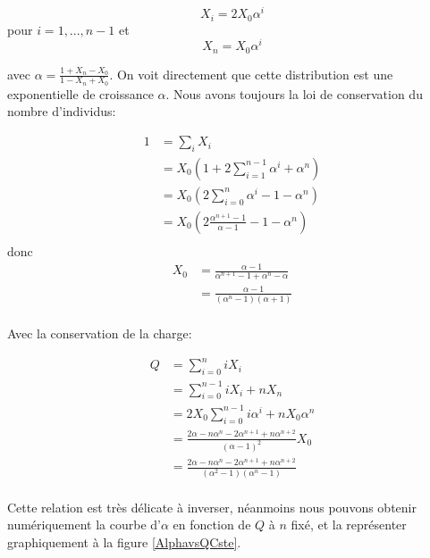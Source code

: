\begin{equation}
X_i=2 X_0 \alpha^i
\end{equation}
pour $i=1,...,n-1$ et 
\begin{equation}
X_n= X_0 \alpha^i
\end{equation}

avec $\alpha = \frac{1+X_n-X_0}{1-X_n+X_0}$.
On voit directement que cette distribution est une exponentielle de croissance $\alpha$. Nous avons toujours la loi de conservation du nombre d'individus:

\begin{equation}
\begin{aligned}
1&= \sum_i X_i\\
	&= X_0 (1+2\sum_{i=1}^{n-1}\alpha^i+\alpha^n)\\
	&= X_0 (2\sum_{i=0}^{n}\alpha^i-1-\alpha^n)\\
	&= X_0 (2 \frac{\alpha^{n+1}-1}{\alpha-1}-1-\alpha^n)\\
\end{aligned}
\end{equation}
donc
\begin{equation}
\begin{aligned}
X_0	&= \frac{\alpha-1}{\alpha^{n+1}-1+\alpha^n-\alpha}\\
	&= \frac{\alpha-1}{(\alpha^{n}-1)(\alpha+1)}\\
\end{aligned}
\end{equation}

Avec la conservation de la charge:

\begin{equation}
\begin{aligned}
Q	&= \sum_{i=0}^n i X_i\\
	&= \sum_{i=0}^{n-1} i X_i + n X_n\\
	&= 2 X_0 \sum_{i=0}^{n-1} i \alpha^i + n X_0 \alpha^n\\
	&= \frac{2\alpha -n\alpha^n-2\alpha^{n+1}+n\alpha^{n+2}}{(\alpha-1)^2}X_0\\
	&= \frac{2\alpha -n\alpha^n-2\alpha^{n+1}+n\alpha^{n+2}}{(\alpha^2-1)(\alpha^{n}-1)}\\
\end{aligned}
\end{equation}

Cette relation est très délicate à inverser, néanmoins nous pouvons obtenir numériquement la courbe d'$\alpha$ en fonction de $Q$ à $n$ fixé, et la représenter graphiquement à la figure \ref{AlphavsQCste}.\\

